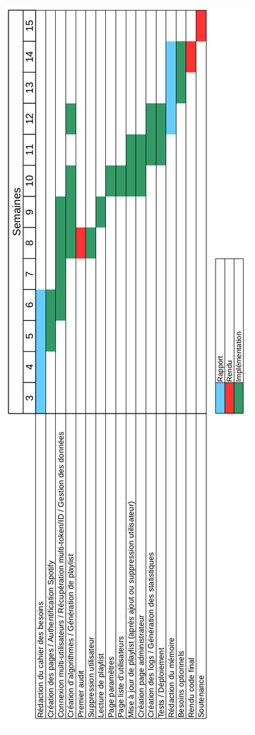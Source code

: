 \documentclass[12pt, openany]{report}
\begin{document}
\includegraphics[scale=0.45]{images/gantt.png}



\end{document}
